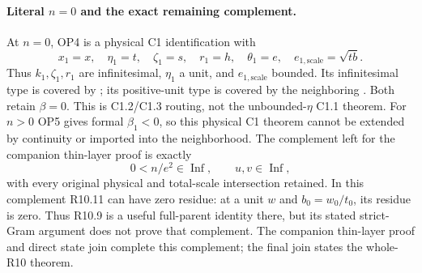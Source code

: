 \paragraph{Literal $n=0$ and the exact remaining complement.}
At $n=0$, OP4 is a physical C1 identification with
\[
 x_1=x,\quad\eta_1=t,\quad\zeta_1=s,\quad r_1=h,
 \quad\theta_1=e,\quad e_{1,\mathrm{scale}}=\sqrt{tb}.
\]
Thus $k_1,\zeta_1,r_1$ are infinitesimal, $\eta_1$ a unit, and
$e_{1,\mathrm{scale}}$ bounded. Its infinitesimal type is covered by
;
its positive-unit type is covered by the neighboring
. Both retain $\beta=0$.
This is C1.2/C1.3 routing, not the unbounded-$\eta$ C1.1 theorem.
For $n>0$ OP5 gives formal $\beta_1<0$, so this physical C1 theorem
cannot be extended by continuity or imported into the neighborhood.
The complement left for the companion thin-layer proof is exactly
\[
       0<n/e^2\in\operatorname{Inf},\qquad u,v\in\operatorname{Inf},
\]
with every original physical and total-scale intersection retained.
In this complement R10.11 can have zero residue: at a unit $w$ and
$b_0=w_0/t_0$, its residue is zero. Thus R10.9 is a useful full-parent
identity there, but its stated strict-Gram argument does not prove that
complement. The companion thin-layer proof and direct state join complete this complement; the final join states the whole-R10 theorem.
